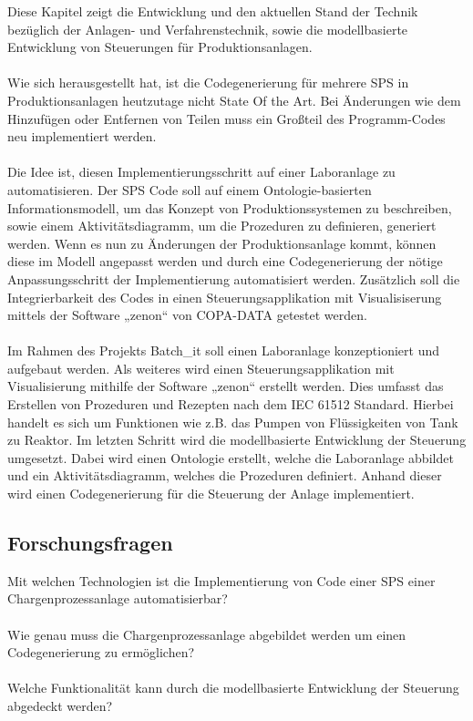 Diese Kapitel zeigt die Entwicklung und den aktuellen Stand der Technik bezüglich der Anlagen- und Verfahrenstechnik, sowie die modellbasierte Entwicklung von Steuerungen für Produktionsanlagen. \\\\
Wie sich herausgestellt hat, ist die Codegenerierung für mehrere SPS in Produktionsanlagen heutzutage nicht State Of the Art. Bei Änderungen wie dem Hinzufügen oder Entfernen von Teilen muss ein Großteil des Programm-Codes neu implementiert werden. \\\\
Die Idee ist, diesen Implementierungsschritt auf einer Laboranlage zu automatisieren. Der SPS Code soll auf einem Ontologie-basierten Informationsmodell, um das Konzept von Produktionssystemen zu beschreiben, sowie einem Aktivitätsdiagramm, um die Prozeduren zu definieren, generiert werden. Wenn es nun zu Änderungen der Produktionsanlage kommt, können diese im Modell angepasst werden und  durch eine Codegenerierung der nötige Anpassungsschritt der Implementierung automatisiert werden. Zusätzlich soll die Integrierbarkeit des Codes in einen Steuerungsapplikation mit Visualisiserung mittels der Software „zenon“ von COPA-DATA getestet werden.\\\\
Im Rahmen des Projekts Batch\_it soll einen Laboranlage konzeptioniert und aufgebaut werden. Als weiteres wird einen Steuerungsapplikation mit Visualisierung mithilfe der Software „zenon“ erstellt werden. Dies umfasst das Erstellen von Prozeduren und Rezepten nach dem IEC 61512 Standard. Hierbei handelt es sich um Funktionen wie z.B. das Pumpen von Flüssigkeiten von Tank zu Reaktor. Im letzten Schritt wird die modellbasierte Entwicklung der Steuerung umgesetzt. Dabei wird einen Ontologie erstellt, welche die Laboranlage abbildet und ein Aktivitätsdiagramm, welches die Prozeduren definiert. Anhand dieser wird einen Codegenerierung für die Steuerung der Anlage implementiert.
\subsection{Forschungsfragen}
Mit welchen Technologien ist die Implementierung von Code einer SPS einer Chargenprozessanlage automatisierbar? \\\\
Wie genau muss die Chargenprozessanlage abgebildet werden um einen Codegenerierung zu ermöglichen? \\\\
Welche Funktionalität kann durch die modellbasierte Entwicklung der Steuerung abgedeckt werden?